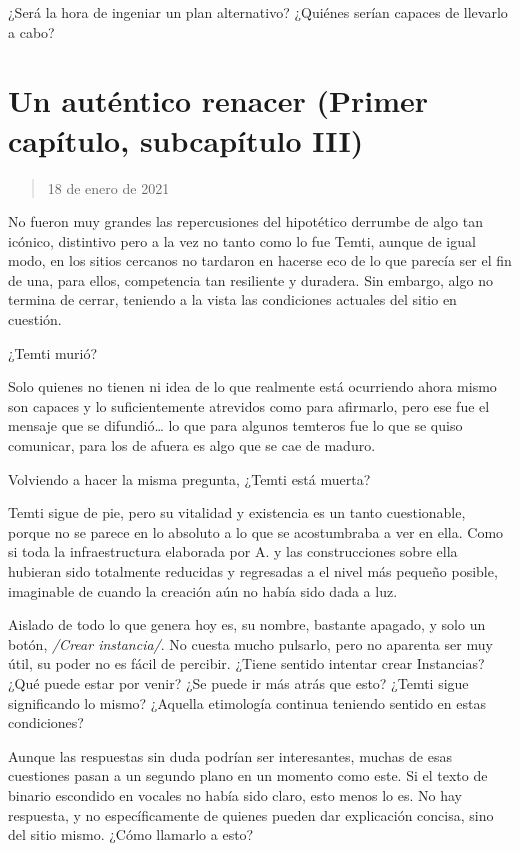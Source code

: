 \documentclass[
  spanish,
]{book}
\begin{document}
¿Será la hora de ingeniar un plan alternativo? ¿Quiénes serían capaces de llevarlo a cabo?

\hypertarget{un-autuxe9ntico-renacer-primer-capuxedtulo-subcapuxedtulo-iii}{%
\section{Un auténtico renacer (Primer capítulo, subcapítulo III)}\label{un-autuxe9ntico-renacer-primer-capuxedtulo-subcapuxedtulo-iii}}

\begin{quote}
18 de enero de 2021
\end{quote}

No fueron muy grandes las repercusiones del hipotético derrumbe de algo tan icónico, distintivo pero a la vez no tanto como lo fue Temti, aunque de igual modo, en los sitios cercanos no tardaron en hacerse eco de lo que parecía ser el fin de una, para ellos, competencia tan resiliente y duradera. Sin embargo, algo no termina de cerrar, teniendo a la vista las condiciones actuales del sitio en cuestión.

¿Temti murió?

Solo quienes no tienen ni idea de lo que realmente está ocurriendo ahora mismo son capaces y lo suficientemente atrevidos como para afirmarlo, pero ese fue el mensaje que se difundió\ldots{} lo que para algunos temteros fue lo que se quiso comunicar, para los de afuera es algo que se cae de maduro.

Volviendo a hacer la misma pregunta, ¿Temti está muerta?

Temti sigue de pie, pero su vitalidad y existencia es un tanto cuestionable, porque no se parece en lo absoluto a lo que se acostumbraba a ver en ella. Como si toda la infraestructura elaborada por A. y las construcciones sobre ella hubieran sido totalmente reducidas y regresadas a el nivel más pequeño posible, imaginable de cuando la creación aún no había sido dada a luz.

Aislado de todo lo que genera hoy es, su nombre, bastante apagado, y solo un botón, \emph{/Crear instancia/}. No cuesta mucho pulsarlo, pero no aparenta ser muy útil, su poder no es fácil de percibir. ¿Tiene sentido intentar crear Instancias? ¿Qué puede estar por venir? ¿Se puede ir más atrás que esto? ¿Temti sigue significando lo mismo? ¿Aquella etimología continua teniendo sentido en estas condiciones?

Aunque las respuestas sin duda podrían ser interesantes, muchas de esas cuestiones pasan a un segundo plano en un momento como este. Si el texto de binario escondido en vocales no había sido claro, esto menos lo es. No hay respuesta, y no específicamente de quienes pueden dar explicación concisa, sino del sitio mismo. ¿Cómo llamarlo a esto?
\end{document}
